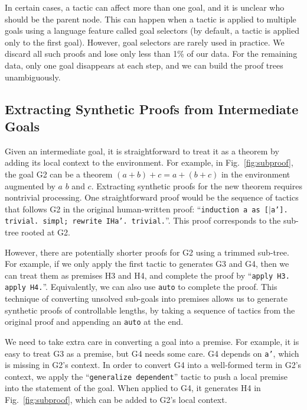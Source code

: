 \documentclass{article}
\begin{document}
In certain cases, a tactic can affect more than one goal, and it is unclear who should be the parent node. This can happen when a tactic is applied to multiple goals using a language feature called goal selectors (by default, a tactic is applied only to the first goal). 
However, goal selectors are rarely used in practice.
We discard all such proofs and lose only less than 1\% of our data.
For the remaining data, only one goal disappears at each step, and we can build the proof trees unambiguously.


\subsection{Extracting Synthetic Proofs from Intermediate Goals}




Given an intermediate goal, it is straightforward to treat it as a theorem by adding its local context to the environment.
For example, in Fig.~\ref{fig:subproof}, the goal G2 can be a theorem $(a + b) + c = a + (b + c)$ in the environment augmented by $a$ $b$ and $c$.
Extracting synthetic proofs for the new theorem requires nontrivial processing.
One straightforward proof would be the sequence of tactics that follows G2 in the original human-written proof: ``\texttt{induction a as [$\vert$a']. trivial. simpl; rewrite IHa'. trivial.}''. This proof corresponds to the sub-tree rooted at G2.

However, there are potentially shorter proofs for G2 using a trimmed sub-tree.
For example, if we only apply the first tactic to generates G3 and G4,
then we can treat them as premises H3 and H4, and complete the proof by ``\texttt{apply H3. apply H4.}''. Equivalently, we can also use \texttt{auto} to complete the proof.
This technique of converting unsolved sub-goals into premises allows us to generate synthetic proofs of controllable lengths, by taking a sequence of tactics from the original proof and appending an \texttt{auto} at the end.


We need to take extra care in converting a goal into a premise. For example, it is easy to treat G3 as a premise, but G4 needs some care.
G4 depends on \texttt{a'}, which is missing in G2's context.
In order to convert G4 into a well-formed term in G2's context,
we apply the ``\texttt{generalize dependent}'' tactic to push a local premise into the statement of the goal.
When applied to G4, it generates H4 in Fig.~\ref{fig:subproof}, which can be added to G2's local context.
\end{document}
